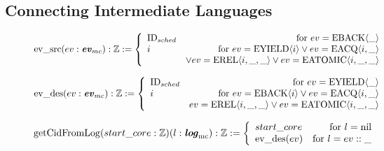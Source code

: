 
\clearpage

\subsection{Connecting Intermediate Languages}
\label{subsec:connect-intermediate-language}



\begin{figure}


%
%

$
{\mathrm{ev}\_\mathrm{src}} (ev : {\mathrm{\textbf{\textit{ev}}}_{mc}}) : {\mathbb{Z}} := 
 \left\{\begin{array}{lr}
{\mathrm{ID}_{sched}} & \text{for } ev = {{\mathrm{EBACK}}\langle{\_}\rangle} \\
i  & \text{for } ev ={{\mathrm{EYIELD}}\langle{i}\rangle}  \vee ev= {{\mathrm{EACQ}}\langle{i}, {\_}\rangle} \\
   & \vee ev = {{\mathrm{EREL}}\langle{i}, {\_}, {\_}\rangle} \vee ev =  {{\mathrm{EATOMIC}}\langle{i}, {\_}, {\_}\rangle}\\
\end{array} \right.
$

%
%

$
{\mathrm{ev}\_\mathrm{des}} (ev : {\mathrm{\textbf{\textit{ev}}}_{mc}}) : {\mathbb{Z}} := 
 \left\{\begin{array}{lr}
{\mathrm{ID}_{sched}} & \text{for } ev ={{\mathrm{EYIELD}}\langle{\_}\rangle} \\
i & \text{for } ev= {{\mathrm{EBACK}}\langle{i}\rangle} \vee ev = {{\mathrm{EACQ}}\langle{i}, {\_}\rangle}\\
   & ev=  {{\mathrm{EREL}}\langle{i}, {\_}, {\_}\rangle} \vee ev = {{\mathrm{EATOMIC}}\langle{i}, {\_}, {\_}\rangle}\\
\end{array} \right.
$

%
%

$
{\mathrm{getCidFromLog}} (start\_core : {\mathbb{Z}}) (l : {\mathrm{\textbf{\textit{log}}}_{\mathrm{mc}}}): {\mathbb{Z}} :=
 \left\{\begin{array}{lr}
start\_core & \text{for }  l = {\mathrm{nil}} \\
{{\mathrm{ev}\_\mathrm{des}}({ev})} & \text{for } l = {{ev}::{\_}}\\
\end{array} \right.
$



\end{figure}
